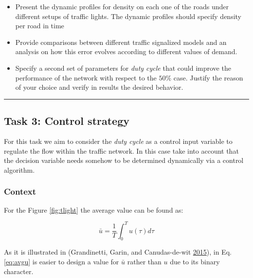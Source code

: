 \documentclass[]{book}
\theoremstyle{definition}
\theoremstyle{definition}
\theoremstyle{definition}
\theoremstyle{remark}
\begin{document}
\begin{itemize}
\item
  Present the dynamic profiles for density on each one of the roads
  under different setups of traffic lights. The dynamic profiles should
  specify density per road in time
\item
  Provide comparisons between different traffic signalized models and an
  analysis on how this error evolves according to different values of
  demand.
\item
  Specify a second set of parameters for \emph{duty cycle} that could
  improve the performance of the network with respect to the \(50\%\)
  case. Justify the reason of your choice and verify in results the
  desired behavior.
\end{itemize}

\begin{center}\rule{0.5\linewidth}{\linethickness}\end{center}

\hypertarget{task-3-control-strategy}{%
\subsection*{Task 3: Control strategy}\label{task-3-control-strategy}}

For this task we aim to consider the \emph{duty cycle} as a control
input variable to regulate the flow within the traffic network. In this
case take into account that the decision variable needs somehow to be
determined dynamically via a control algorithm.

\hypertarget{context-3}{%
\subsubsection*{Context}\label{context-3}}

For the Figure \ref{fig:tlight} the average value can be found as:

\begin{equation}
\bar{u} = \frac{1}{T}\int_0^T u(\tau) d\tau \label{eq:avgu}
\end{equation}

As it is illustrated in (Grandinetti, Garin, and Canudas-de-wit
\protect\hyperlink{ref-Grandinetti2016}{2015}), in Eq. \eqref{eq:avgu} is
easier to design a value for \(\bar{u}\) rather than \(u\) due to its
binary character.
\end{document}
